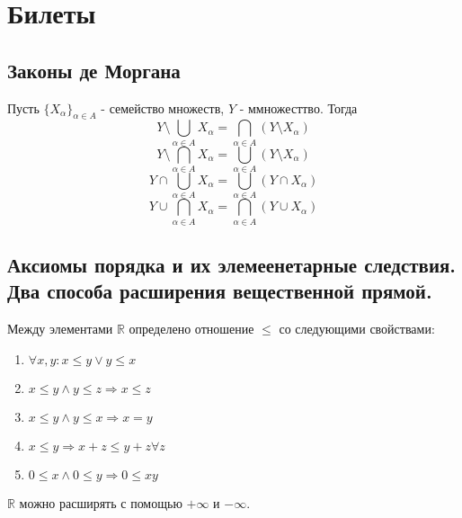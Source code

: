 \documentclass{article}
\begin{document}
\pagestyle{empty}
\normalsize

\section{Билеты}
\subsection{Законы де Моргана}
Пусть $\{X_{\alpha}\}_{\alpha \in A}$ - семейство множеств, $Y$ - ммножесттво. Тогда
\begin{equation}
	Y \setminus \displaystyle\bigcup\limits_{\alpha \in A}X_{\alpha} = \displaystyle \bigcap\limits_{\alpha \in A}(Y \setminus X_{\alpha})
\end{equation}
\begin{equation}
	Y \setminus \displaystyle \bigcap\limits_{\alpha \in A}X_{\alpha} = \displaystyle \bigcup\limits_{\alpha \in A}(Y \setminus X_{\alpha})
\end{equation}
\begin{equation}
	Y \cap \displaystyle\bigcup\limits_{\alpha \in A}X_{\alpha} = \displaystyle\bigcup\limits_{\alpha \in A}(Y \cap X_{\alpha})
\end{equation}
\begin{equation}
	Y \cup \displaystyle\bigcap\limits_{\alpha \in A}X_{\alpha} = \displaystyle\bigcap\limits_{\alpha \in A}(Y \cup X_{\alpha})
\end{equation}

\subsection{Аксиомы порядка и их элемеенетарные следствия. Два способа расширения вещественной прямой.}
Между элементами $\mathbb{R}$ определено отношение $\leq$ со следующими свойствами:
\begin{enumerate}
	\item $\forall x, y: x \leq y \vee y \leq x$
	\item $x \leq y \wedge y \leq z \Rightarrow x \leq z$
	\item $x \leq y \wedge y \leq x \Rightarrow x = y$
	\item $x \leq y \Rightarrow x + z \leq y + z \forall z$
	\item $0 \leq x \wedge 0 \leq y \Rightarrow 0 \leq xy$
\end{enumerate}

\noindent$\mathbb{R}$ можно расширять с помощью $+\infty$ и $-\infty$.  
\end{document}
